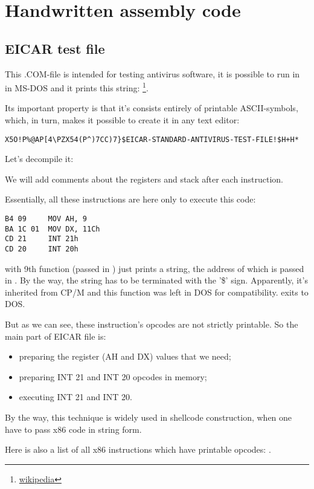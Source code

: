 \section{Handwritten assembly code}

\subsection{ EICAR test file}
\label{subsec:EICAR}

This .COM-file is intended for testing antivirus software, it is possible to run in
in MS-DOS and it prints this string: 
\footnote{\href{http://go.yurichev.com/17006}{wikipedia}}.

Its important property is that it's consists entirely of printable 
ASCII-symbols, which, in turn, makes it possible to create it in any text editor:

\begin{lstlisting}
X5O!P%@AP[4\PZX54(P^)7CC)7}$EICAR-STANDARD-ANTIVIRUS-TEST-FILE!$H+H*
\end{lstlisting}

Let's decompile it:



We will add comments about the registers and stack after each instruction.

Essentially, all these
instructions are here only to execute this code:

\begin{lstlisting}[style=customasmx86]
B4 09     MOV AH, 9
BA 1C 01  MOV DX, 11Ch
CD 21     INT 21h
CD 20     INT 20h
\end{lstlisting}

 with 9th
function (passed in ) just prints a string, the address of which is passed in .
By the way, the string has to be terminated
with the '\$' sign.
Apparently, it's inherited from \gls{CP/M} 
and this function was left in DOS for compatibility.
 exits to DOS.

But as we can see, these instruction's
opcodes are not strictly printable.
So the main part of EICAR file is:

\begin{itemize}
\item preparing the register (AH and DX) values that we need;
\item preparing INT 21 and INT 20 opcodes in memory;
\item executing INT 21 and INT 20.
\end{itemize}


By the way, this technique is widely used in shellcode construction, when one have to pass x86 code
in string form.

Here is also a list of all 
x86 instructions which have printable opcodes: .
